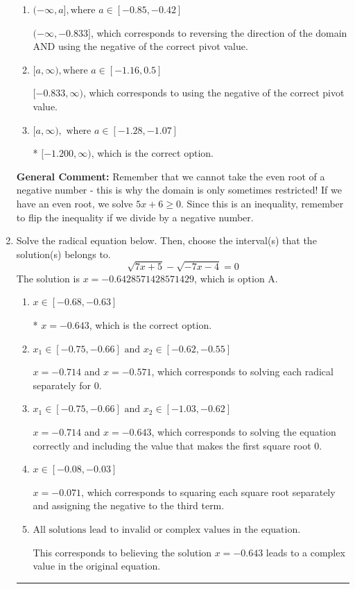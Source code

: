 \documentclass{extbook}[14pt]
\newcommand{\litem}[1]{\item #1

\rule{\textwidth}{0.4pt}}
\begin{document}
\begin{enumerate}
{\begin{enumerate}[label=\Alph*.]
 $(-\infty, -1.200]$, which corresponds to reversing the direction of the domain.
\item \( (-\infty, a], \text{where } a \in [-0.85, -0.42] \)

$(-\infty, -0.833]$, which corresponds to reversing the direction of the domain AND using the negative of the correct pivot value.
\item \( [a, \infty), \text{where } a \in [-1.16, 0.5] \)

$[-0.833, \infty)$, which corresponds to using the negative of the correct pivot value.
\item \( [a, \infty), \text{ where } a \in [-1.28, -1.07] \)

* $[-1.200, \infty)$, which is the correct option.
\end{enumerate}

\textbf{General Comment:} Remember that we cannot take the even root of a negative number - this is why the domain is only sometimes restricted! If we have an even root, we solve $5 x + 6 \geq 0$. Since this is an inequality, remember to flip the inequality if we divide by a negative number.
}
\litem{
Solve the radical equation below. Then, choose the interval(s) that the solution(s) belongs to.
\[ \sqrt{7 x + 5} - \sqrt{-7 x - 4} = 0 \]The solution is \( x = -0.6428571428571429 \), which is option A.\begin{enumerate}[label=\Alph*.]
\item \( x \in [-0.68,-0.63] \)

* $x = -0.643$, which is the correct option.
\item \( x_1 \in [-0.75, -0.66] \text{ and } x_2 \in [-0.62,-0.55] \)

$x = -0.714$ and $x = -0.571$, which corresponds to solving each radical separately for 0.
\item \( x_1 \in [-0.75, -0.66] \text{ and } x_2 \in [-1.03,-0.62] \)

$x = -0.714$ and $x = -0.643$, which corresponds to solving the equation correctly and including the value that makes the first square root 0.
\item \( x \in [-0.08,-0.03] \)

$x = -0.071$, which corresponds to squaring each square root separately and assigning the negative to the third term.
\item \( \text{All solutions lead to invalid or complex values in the equation.} \)

This corresponds to believing the solution $x = -0.643$ leads to a complex value in the original equation.
\end{enumerate}

}
\end{enumerate}
\end{document}
